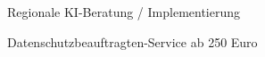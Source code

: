 \documentclass{article}
\begin{document}
\footnotesize
\begin{minipage}{2.3cm}
\raggedright
Regionale KI-Be­ra­tung / Im­ple­men­tie­rung

Da­ten­schutz­be­auf­trag­ten-Ser­vice ab 250 Euro
\end{minipage}
\end{document}
